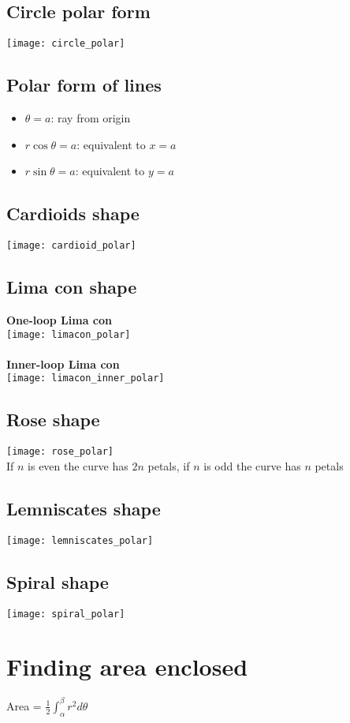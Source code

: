 \subsection{Circle polar form}
\texttt{[image: circle\_polar]}

\subsection{Polar form of lines}
\begin{itemize}
    \item $\theta=a$: ray from origin
    \item $r\cos\theta=a$: equivalent to $x=a$
    \item $r\sin\theta=a$: equivalent to $y=a$
\end{itemize}

\subsection{Cardioids shape}
\texttt{[image: cardioid\_polar]}
\subsection{Lima con shape}
\textbf{One-loop Lima con}\\
\texttt{[image: limacon\_polar]}\\ \\
\textbf{Inner-loop Lima con}\\
\texttt{[image: limacon\_inner\_polar]}
\subsection{Rose shape}
\texttt{[image: rose\_polar]}\\
If $n$ is even the curve has $2n$ petals, if $n$ is odd the curve has $n$ petals

\subsection{Lemniscates shape}
\texttt{[image: lemniscates\_polar]}

\subsection{Spiral shape}
\texttt{[image: spiral\_polar]}




\section{Finding area enclosed}
Area = $\frac{1}{2}\int_{\alpha}^{\beta} r^2d\theta$